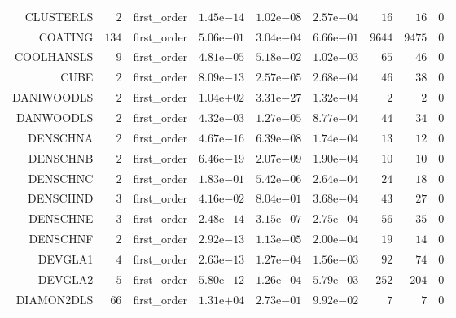 \begin{longtable}{rrrrrrrrr}
CLUSTERLS & \(     2\) & first\_order & \( 1.45\)e\(-14\) & \( 1.02\)e\(-08\) & \( 2.57\)e\(-04\) & \(    16\) & \(    16\) & \(     0\) \\
COATING & \(   134\) & first\_order & \( 5.06\)e\(-01\) & \( 3.04\)e\(-04\) & \( 6.66\)e\(-01\) & \(  9644\) & \(  9475\) & \(     0\) \\
COOLHANSLS & \(     9\) & first\_order & \( 4.81\)e\(-05\) & \( 5.18\)e\(-02\) & \( 1.02\)e\(-03\) & \(    65\) & \(    46\) & \(     0\) \\
CUBE & \(     2\) & first\_order & \( 8.09\)e\(-13\) & \( 2.57\)e\(-05\) & \( 2.68\)e\(-04\) & \(    46\) & \(    38\) & \(     0\) \\
DANIWOODLS & \(     2\) & first\_order & \( 1.04\)e\(+02\) & \( 3.31\)e\(-27\) & \( 1.32\)e\(-04\) & \(     2\) & \(     2\) & \(     0\) \\
DANWOODLS & \(     2\) & first\_order & \( 4.32\)e\(-03\) & \( 1.27\)e\(-05\) & \( 8.77\)e\(-04\) & \(    44\) & \(    34\) & \(     0\) \\
DENSCHNA & \(     2\) & first\_order & \( 4.67\)e\(-16\) & \( 6.39\)e\(-08\) & \( 1.74\)e\(-04\) & \(    13\) & \(    12\) & \(     0\) \\
DENSCHNB & \(     2\) & first\_order & \( 6.46\)e\(-19\) & \( 2.07\)e\(-09\) & \( 1.90\)e\(-04\) & \(    10\) & \(    10\) & \(     0\) \\
DENSCHNC & \(     2\) & first\_order & \( 1.83\)e\(-01\) & \( 5.42\)e\(-06\) & \( 2.64\)e\(-04\) & \(    24\) & \(    18\) & \(     0\) \\
DENSCHND & \(     3\) & first\_order & \( 4.16\)e\(-02\) & \( 8.04\)e\(-01\) & \( 3.68\)e\(-04\) & \(    43\) & \(    27\) & \(     0\) \\
DENSCHNE & \(     3\) & first\_order & \( 2.48\)e\(-14\) & \( 3.15\)e\(-07\) & \( 2.75\)e\(-04\) & \(    56\) & \(    35\) & \(     0\) \\
DENSCHNF & \(     2\) & first\_order & \( 2.92\)e\(-13\) & \( 1.13\)e\(-05\) & \( 2.00\)e\(-04\) & \(    19\) & \(    14\) & \(     0\) \\
DEVGLA1 & \(     4\) & first\_order & \( 2.63\)e\(-13\) & \( 1.27\)e\(-04\) & \( 1.56\)e\(-03\) & \(    92\) & \(    74\) & \(     0\) \\
DEVGLA2 & \(     5\) & first\_order & \( 5.80\)e\(-12\) & \( 1.26\)e\(-04\) & \( 5.79\)e\(-03\) & \(   252\) & \(   204\) & \(     0\) \\
DIAMON2DLS & \(    66\) & first\_order & \( 1.31\)e\(+04\) & \( 2.73\)e\(-01\) & \( 9.92\)e\(-02\) & \(     7\) & \(     7\) & \(     0\) \\

\end{longtable}
